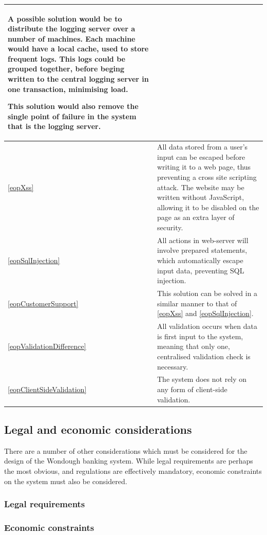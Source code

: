 \begin{longtable}{|| p{} | p{} ||}
        A possible solution would be to distribute the logging server over a number of machines. Each machine would have a local cache, used to store frequent logs. This logs could be grouped together, before beging written to the central logging server in one transaction, minimising load.

        This solution would also remove the single point of failure in the system that is the logging server.
    \\ \hline \ref{eopXss} &
        All data stored from a user's input can be escaped before writing it to a web page, thus preventing a cross site scripting attack. The website may be written without JavaScript, allowing it to be disabled on the page as an extra layer of security.
    \\ \hline \ref{eopSqlInjection} &
        All actions in web-server will involve prepared statements, which automatically escape input data, preventing SQL injection.
    \\ \hline \ref{eopCustomerSupport} &
        This solution can be solved in a similar manner to that of \ref{eopXss} and \ref{eopSqlInjection}.
    \\ \hline \ref{eopValidationDifference} & 
        All validation occurs when data is first input to the system, meaning that only one, centralised validation check is necessary.
    \\ \hline \ref{eopClientSideValidation} &
        The system does not rely on any form of client-side validation.
    \\ \hline

\end{longtable}

\subsection{Legal and economic considerations}

There are a number of other considerations which must be considered for the design of the Wondough banking system. While legal requirements are perhaps the most obvious, and regulations are effectively mandatory, economic constraints on the system must also be considered.

\subsubsection{Legal requirements}



\subsubsection{Economic constraints}

